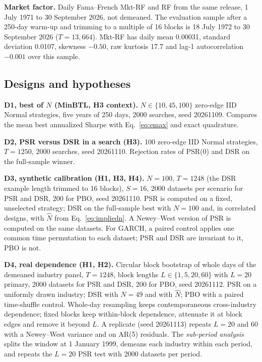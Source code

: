 \documentclass[11pt,a4paper]{article}
\theoremstyle{remark}
\begin{document}
\textbf{Market factor.} Daily Fama--French Mkt-RF and RF from the same release, 1 July 1971 to 30 September 2026, not demeaned. The evaluation sample after a 250-day warm-up and trimming to a multiple of 16 blocks is 18 July 1972 to 30 September 2026 ($T=13{,}664$). Mkt-RF has daily mean 0.00031, standard deviation 0.0107, skewness $-0.50$, raw kurtosis 17.7 and lag-1 autocorrelation $-0.001$ over this sample.

\subsection{Designs and hypotheses}
\textbf{D1, best of $N$ (MinBTL, H3 context).} $N\in\{10,45,100\}$ zero-edge IID Normal strategies, five years of 250 days, 2000 searches, seed 20261109. Compares the mean best annualized Sharpe with Eq.~\eqref{eq:emax} and exact quadrature.

\textbf{D2, PSR versus DSR in a search (H3).} 100 zero-edge IID Normal strategies, $T=1250$, 2000 searches, seed 20261110. Rejection rates of PSR(0) and DSR on the full-sample winner.

\textbf{D3, synthetic calibration (H1, H3, H4).} $N=100$, $T=1248$ (the DSR example length trimmed to 16 blocks), $S=16$, 2000 datasets per scenario for PSR and DSR, 200 for PBO, seed 20261110. PSR is computed on a fixed, unselected strategy; DSR on the full-sample best with $N=100$ and, in correlated designs, with $\hat N$ from Eq.~\eqref{eq:impliedn}. A Newey--West version of PSR is computed on the same datasets. For GARCH, a paired control applies one common time permutation to each dataset; PSR and DSR are invariant to it, PBO is not.

\textbf{D4, real dependence (H1, H2).} Circular block bootstrap \citep{kunsch1989,politis1992circular} of whole days of the demeaned industry panel, $T=1248$, block lengths $L\in\{1,5,20,60\}$ with $L=20$ primary, 2000 datasets for PSR and DSR, 200 for PBO, seed 20261112. PSR on a uniformly drawn industry; DSR with $N=49$ and with $\hat N$; PBO with a paired time-shuffle control. Whole-day resampling keeps contemporaneous cross-industry dependence; fixed blocks keep within-block dependence, attenuate it at block edges and remove it beyond $L$. A replicate (seed 20261113) repeats $L=20$ and $60$ with a Newey--West variance and on AR(5) residuals. The \emph{sub-period analysis} splits the window at 1 January 1999, demeans each industry within each period, and repeats the $L=20$ PSR test with 2000 datasets per period.
\end{document}
